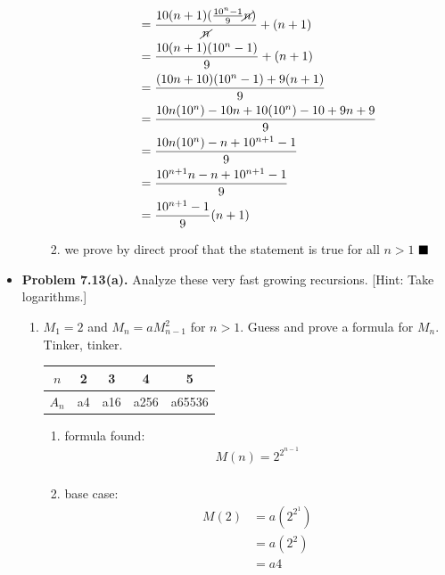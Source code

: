 \documentclass{article}
\begin{document}
\begin{itemize}
\begin{enumerate}[label=(c)]
\begin{enumerate}[label=\roman*.]
\begin{align*}
                    &= \frac{10(n+1)(\frac{10^n-1}{9}\cancel{n})}{\cancel{n}} + (n+1)\\
                    &= \frac{10(n+1)(10^n-1)}{9} + (n+1)\\
                    &= \frac{(10n+10)(10^n-1) + 9(n+1)}{9}\\
                    &= \frac{10n(10^n) - 10n + 10(10^n) - 10 + 9n + 9}{9}\\
                    &= \frac{10n(10^n) - n + 10^{n+1} - 1}{9}\\
                    &= \frac{10^{n+1}n - n + 10^{n+1} - 1}{9}\\
                    &= \frac{10^{n+1} - 1}{9}(n+1)
                \end{align*}
                \item we prove by direct proof that the statement is true for all $n > 1$ $\hfill \blacksquare$
            \end{enumerate}
        \end{enumerate}
        \item \textbf{Problem 7.13(a).} Analyze these very fast growing recursions. [Hint: Take logarithms.]
        \begin{enumerate}[label=(a)]
            \item $M_1 = 2$ and $M_n = aM^2_{n-1}$ for $n>1$. Guess and prove a formula for $M_n$. Tinker, tinker.
            \begin{tabular}{ |c|c|c|c|c| } 
                \hline
                $n$ & 2 & 3 & 4 & 5\\ 
                \hline
                $A_n$ & a4 & a16 & a256 & a65536 \\
                \hline
            \end{tabular}
            \begin{enumerate}[label=(\roman*)]
                \item formula found:
                \begin{align*}
                    M(n) = 2^{2^{n-1}}\\
                \end{align*}
                \item base case:
                \begin{align*}
                    M(2) &= a(2^{2^1})\\
                         &= a(2^2)\\
                         &= a4
                \end{align*}

\end{enumerate}
\end{enumerate}
\end{itemize}
\end{document}
